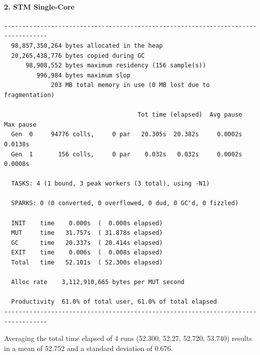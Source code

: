 \paragraph{2. STM Single-Core}
\begin{verbatim}
----------------------------------------------------------------------------------
  98,857,350,264 bytes allocated in the heap
  20,265,438,776 bytes copied during GC
      98,908,552 bytes maximum residency (156 sample(s))
         996,984 bytes maximum slop
             203 MB total memory in use (0 MB lost due to fragmentation)

                                     Tot time (elapsed)  Avg pause  Max pause
  Gen  0     94776 colls,     0 par   20.305s  20.382s     0.0002s    0.0138s
  Gen  1       156 colls,     0 par    0.032s   0.032s     0.0002s    0.0008s

  TASKS: 4 (1 bound, 3 peak workers (3 total), using -N1)

  SPARKS: 0 (0 converted, 0 overflowed, 0 dud, 0 GC'd, 0 fizzled)

  INIT    time    0.000s  (  0.000s elapsed)
  MUT     time   31.757s  ( 31.878s elapsed)
  GC      time   20.337s  ( 20.414s elapsed)
  EXIT    time    0.006s  (  0.008s elapsed)
  Total   time   52.101s  ( 52.300s elapsed)

  Alloc rate    3,112,910,665 bytes per MUT second

  Productivity  61.0% of total user, 61.0% of total elapsed
----------------------------------------------------------------------------------
\end{verbatim}

Averaging the total time elapsed of 4 runs (52.300, 52.27, 52.720, 53.740) results in a mean of 52.752 and a standard deviation of 0.676.

